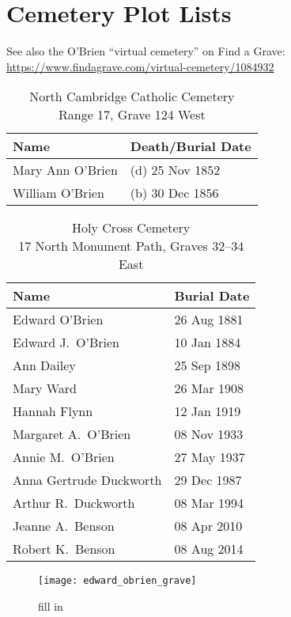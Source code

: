 \section{Cemetery Plot Lists}

\setlength{\parindent}{0cm}

See also the O'Brien ``virtual cemetery'' on Find a Grave: \url{https://www.findagrave.com/virtual-cemetery/1084932}

\begin{table}[h]
	\centering
		\caption{North Cambridge Catholic Cemetery \\
		Range 17, Grave 124 West}
	\begin{tabular}{|l|l|}
		\hline
		\textbf{Name} & \textbf{Death/Burial Date} \\
		\hline
	Mary Ann O'Brien & (d) 25 Nov 1852 \\
	\hline
	William O'Brien & (b) 30 Dec 1856 \\
	\hline
	\end{tabular}
\end{table}

\begin{table}[h]
	\centering
	\caption{Holy Cross Cemetery \\
		17 North Monument Path, Graves 32--34 East}
	\begin{tabular}{|l|l|}
		\hline
		\textbf{Name} & \textbf{Burial Date} \\
	\hline
	Edward O'Brien & 26 Aug 1881 \\
	\hline
	Edward J.\ O'Brien & 10 Jan 1884 \\
	\hline
	Ann Dailey & 25 Sep 1898 \\
	\hline
	Mary Ward & 26 Mar 1908 \\
	\hline
	Hannah Flynn & 12 Jan 1919 \\
	\hline
	Margaret A.\ O'Brien & 08 Nov 1933 \\
	\hline
	Annie M.\ O'Brien & 27 May 1937 \\
	\hline
	Anna Gertrude Duckworth & 29 Dec 1987 \\
	\hline
	Arthur R.\ Duckworth & 08 Mar 1994 \\
	\hline
	Jeanne A.\ Benson & 08 Apr 2010 \\
	\hline
	Robert K.\ Benson & 08 Aug 2014 \\
	\hline
	\end{tabular}
\end{table}

\begin{figure}
	\centering
	\texttt{[image: edward\_obrien\_grave]}
	\caption{fill in}
\end{figure}

